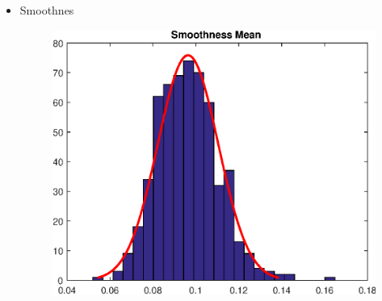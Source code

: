 \documentclass[11pt,a4paper]{article}
\numberwithin{equation}{section}
\begin{document}
\begin{itemize}
\begin{figure}[H]
\begin{minipage}{.5\textwidth}
  \label{fig:test2}
\end{minipage}
\end{figure}

\item Smoothnes
\begin{figure}[H]
\centering
  \includegraphics[width=.5\linewidth]{./img/smoothness_mean}
  \label{fig:test1}
\end{figure}%


\end{itemize}
\end{document}
